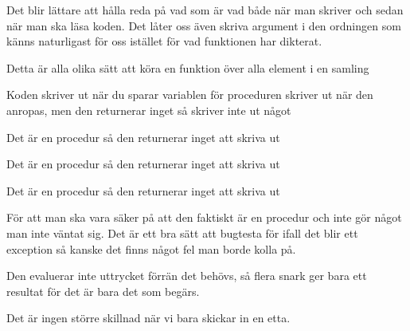 \Subtask
Det blir lättare att hålla reda på vad som är vad både när man skriver och sedan när man ska läsa koden. Det låter oss även skriva argument i den ordningen som känns naturligast för oss istället för vad funktionen har dikterat.

\Task
Detta är alla olika sätt att köra en funktion över alla element i en samling

\Subtask {}

\Subtask {}

\Subtask {}

\Subtask {}

\Subtask {}

\Subtask {}

\Subtask {}

\Subtask {}

\Task

\Subtask {}

\Subtask {}

\Subtask Koden skriver ut  när du sparar variablen för proceduren skriver ut när den anropas, men den returnerar inget så  skriver inte ut något

\Subtask Det är en procedur så den returnerar inget att skriva ut

\Subtask Det är en procedur så den returnerar inget att skriva ut

\Subtask Det är en procedur så den returnerar inget att skriva ut

\Subtask För att man ska vara säker på att den faktiskt är en procedur och inte gör något man inte väntat sig. Det är ett bra sätt att bugtesta för ifall det blir ett exception så kanske det finns något fel man borde kolla på.

\Task

\Subtask {}

\Subtask {}

Den evaluerar inte uttrycket förrän det behövs, så flera snark ger bara ett resultat för det är bara det som begärs.

\Subtask {}

\Subtask {}

Det är ingen större skillnad när vi bara skickar in en etta.

